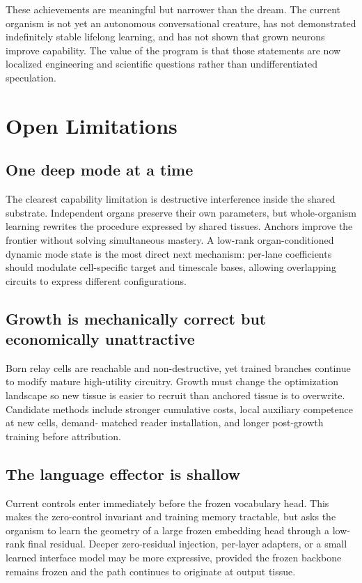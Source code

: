 \documentclass[11pt]{article}
\begin{document}
These achievements are meaningful but narrower than the dream. The current organism is
not yet an autonomous conversational creature, has not demonstrated indefinitely stable
lifelong learning, and has not shown that grown neurons improve capability. The value of
the program is that those statements are now localized engineering and scientific
questions rather than undifferentiated speculation.

\section{Open Limitations}

\subsection{One deep mode at a time}

The clearest capability limitation is destructive interference inside the shared
substrate. Independent organs preserve their own parameters, but whole-organism learning
rewrites the procedure expressed by shared tissues. Anchors improve the frontier without
solving simultaneous mastery. A low-rank organ-conditioned dynamic mode state is the
most direct next mechanism: per-lane coefficients should modulate cell-specific target
and timescale bases, allowing overlapping circuits to express different configurations.

\subsection{Growth is mechanically correct but economically unattractive}

Born relay cells are reachable and non-destructive, yet trained branches continue to
modify mature high-utility circuitry. Growth must change the optimization landscape so
new tissue is easier to recruit than anchored tissue is to overwrite. Candidate methods
include stronger cumulative costs, local auxiliary competence at new cells, demand-
matched reader installation, and longer post-growth training before attribution.

\subsection{The language effector is shallow}

Current controls enter immediately before the frozen vocabulary head. This makes the
zero-control invariant and training memory tractable, but asks the organism to learn the
geometry of a large frozen embedding head through a low-rank final residual. Deeper
zero-residual injection, per-layer adapters, or a small learned interface model may be
more expressive, provided the frozen backbone remains frozen and the path continues to
originate at output tissue.
\end{document}

